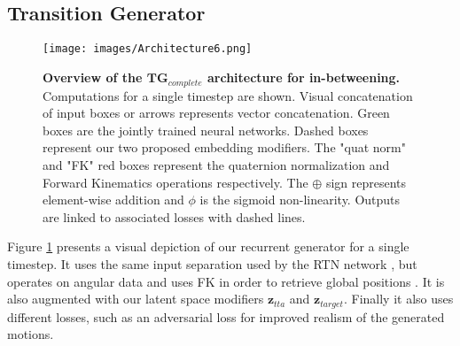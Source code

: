\documentclass[acmtog]{acmart}
\newcommand{\bz}{\textbf{z}}
\begin{document}
\subsection{Transition Generator}\label{section:overview}
\begin{figure}[h]
\begin{center}
\texttt{[image: images/Architecture6.png]}
  \caption{\textbf{Overview of the $\mathrm{\textbf{TG}}_{\mathit{complete}}$ architecture for in-betweening.} Computations for a single timestep are shown. Visual concatenation of input boxes or arrows represents vector concatenation. Green boxes are the jointly trained neural networks. Dashed boxes represent our two proposed embedding modifiers. The "quat norm" and "FK" red boxes represent the quaternion normalization and Forward Kinematics operations respectively. The $\oplus$ sign represents element-wise addition and $\phi$ is the sigmoid non-linearity. Outputs are linked to associated losses with dashed lines.}
  \label{fig:overview}
\end{center}
\vspace{-0.5cm}
\end{figure}

Figure \ref{fig:overview} presents a visual depiction of our recurrent generator for a single timestep. It uses the same input separation used by the RTN network \cite{harvey2018recurrent}, but operates on angular data and uses FK in order to retrieve global positions \cite{pavllo2019modeling}. It is also augmented with our latent space modifiers $\bz_{\mathit{tta}}$ and $\bz_{\mathit{target}}$. Finally it also uses different losses, such as an adversarial loss for improved realism of the generated motions.
\end{document}
